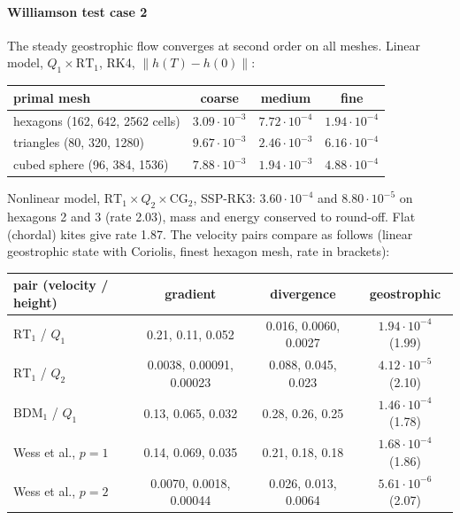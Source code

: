 \documentclass[preprint,12pt]{elsarticle}
\theoremstyle{definition}
\begin{document}
\paragraph{Williamson test case 2} The steady geostrophic flow \cite{Williamson1992} converges at second
order on all meshes. Linear model, $Q_1\times\mathrm{RT}_1$, RK4, $\|h(T)-h(0)\|$:
\begin{center}
\begin{tabular}{lccc}
\toprule
primal mesh & coarse & medium & fine \\
\midrule
hexagons (162, 642, 2562 cells) & $3.09\cdot10^{-3}$ & $7.72\cdot10^{-4}$ & $1.94\cdot10^{-4}$ \\
triangles (80, 320, 1280)       & $9.67\cdot10^{-3}$ & $2.46\cdot10^{-3}$ & $6.16\cdot10^{-4}$ \\
cubed sphere (96, 384, 1536)    & $7.88\cdot10^{-3}$ & $1.94\cdot10^{-3}$ & $4.88\cdot10^{-4}$ \\
\bottomrule
\end{tabular}
\end{center}
Nonlinear model, $\mathrm{RT}_1\times Q_2\times\mathrm{CG}_2$, SSP-RK3: $3.60\cdot10^{-4}$ and
$8.80\cdot10^{-5}$ on hexagons 2 and 3 (rate 2.03), mass and energy conserved to round-off. Flat
(chordal) kites give rate 1.87. The velocity pairs compare as follows (linear geostrophic state with
Coriolis, finest hexagon mesh, rate in brackets):
\begin{center}\footnotesize\setlength{\tabcolsep}{3pt}
\begin{tabular}{lccc}
\toprule
pair (velocity / height) & gradient & divergence & geostrophic \\
\midrule
$\mathrm{RT}_1$ / $Q_1$            & 0.21, 0.11, 0.052     & 0.016, 0.0060, 0.0027 & $1.94\cdot10^{-4}$ (1.99) \\
$\mathrm{RT}_1$ / $Q_2$            & 0.0038, 0.00091, 0.00023 & 0.088, 0.045, 0.023 & $4.12\cdot10^{-5}$ (2.10) \\
$\mathrm{BDM}_1$ / $Q_1$           & 0.13, 0.065, 0.032    & 0.28, 0.26, 0.25      & $1.46\cdot10^{-4}$ (1.78) \\
Wess et al., $p=1$ & 0.14, 0.069, 0.035 & 0.21, 0.18, 0.18    & $1.68\cdot10^{-4}$ (1.86) \\
Wess et al., $p=2$ & 0.0070, 0.0018, 0.00044 & 0.026, 0.013, 0.0064 & $5.61\cdot10^{-6}$ (2.07) \\
\bottomrule
\end{tabular}
\end{center}
\end{document}
